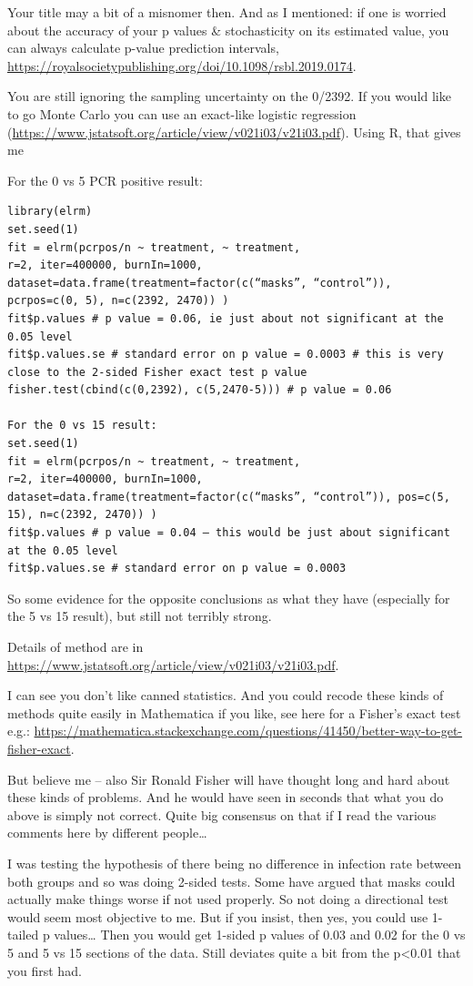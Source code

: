 \documentclass[
]{book}
\begin{document}
Your title may a bit of a misnomer then. And as I mentioned: if one is worried about the accuracy of your p values \& stochasticity on its estimated value, you can always calculate p-value prediction intervals, \url{https://royalsocietypublishing.org/doi/10.1098/rsbl.2019.0174}.

You are still ignoring the sampling uncertainty on the 0/2392. If you would like to go Monte Carlo you can use an exact-like logistic regression (\url{https://www.jstatsoft.org/article/view/v021i03/v21i03.pdf}). Using R, that gives me

For the 0 vs 5 PCR positive result:

\begin{verbatim}
library(elrm)
set.seed(1)
fit = elrm(pcrpos/n ~ treatment, ~ treatment,
r=2, iter=400000, burnIn=1000,
dataset=data.frame(treatment=factor(c(“masks”, “control”)), pcrpos=c(0, 5), n=c(2392, 2470)) )
fit$p.values # p value = 0.06, ie just about not significant at the 0.05 level
fit$p.values.se # standard error on p value = 0.0003 # this is very close to the 2-sided Fisher exact test p value
fisher.test(cbind(c(0,2392), c(5,2470-5))) # p value = 0.06

For the 0 vs 15 result:
set.seed(1)
fit = elrm(pcrpos/n ~ treatment, ~ treatment,
r=2, iter=400000, burnIn=1000,
dataset=data.frame(treatment=factor(c(“masks”, “control”)), pos=c(5, 15), n=c(2392, 2470)) )
fit$p.values # p value = 0.04 – this would be just about significant at the 0.05 level
fit$p.values.se # standard error on p value = 0.0003
\end{verbatim}

So some evidence for the opposite conclusions as what they have (especially for the 5 vs 15 result), but still not terribly strong.

Details of method are in \url{https://www.jstatsoft.org/article/view/v021i03/v21i03.pdf}.

I can see you don't like canned statistics. And you could recode these kinds of methods quite easily in Mathematica if you like, see here for a Fisher's exact test e.g.:
\url{https://mathematica.stackexchange.com/questions/41450/better-way-to-get-fisher-exact}.

But believe me -- also Sir Ronald Fisher will have thought long and hard about these kinds of problems. And he would have seen in seconds that what you do above is simply not correct. Quite big consensus on that if I read the various comments here by different people\ldots{}

I was testing the hypothesis of there being no difference in infection rate between both groups and so was doing 2-sided tests. Some have argued that masks could actually make things worse if not used properly. So not doing a directional test would seem most objective to me. But if you insist, then yes, you could use 1-tailed p values\ldots{} Then you would get 1-sided p values of 0.03 and 0.02 for the 0 vs 5 and 5 vs 15 sections of the data. Still deviates quite a bit from the p\textless0.01 that you first had.
\end{document}
